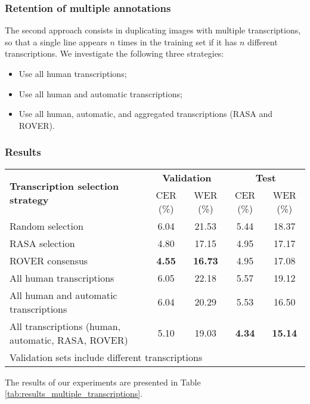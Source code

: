 \documentclass[sigconf]{acmart}
\begin{document}
\subsubsection{Retention of multiple annotations} 
The second approach consists in duplicating images with multiple transcriptions, so that a single line appears $n$ times in the training set if it has $n$ different transcriptions. We investigate the following three strategies:

\begin{itemize}
    \item Use all human transcriptions;
    \item Use all human and automatic transcriptions; 
    \item Use all human, automatic, and aggregated transcriptions (RASA and ROVER).
\end{itemize}

\subsubsection{Results} 

\begin{table*}[thb]
    \centering
    \caption{Evaluation results for experiments on transcription selection. The same PyLaia architecture is trained using different transcriptions}
    \label{tab:results_multiple_transcriptions}
    \begin{tabular}{l|cccc}
    \toprule
        \multirow{2}{*}{\bf Transcription selection strategy} & \multicolumn{2}{c}{\bf Validation\footnotemark[1]} & \multicolumn{2}{c}{\bf Test}\\
        & CER (\%) & WER (\%)  & CER (\%) & WER (\%) \\
    \midrule
        Random selection  & 6.04 & 21.53 & 5.44 & 18.37\\
        RASA selection & 4.80 & 17.15 & 4.95 & 17.17 \\
        ROVER consensus & \textbf{4.55} & \textbf{16.73} & 4.95 & 17.08 \\
        All human transcriptions & 6.05  & 22.18 & 5.57 & 19.12 \\
        All human and automatic transcriptions & 6.04 & 20.29 & 5.53 & 16.50 \\
        All transcriptions (human, automatic, RASA, ROVER) & 5.10 & 19.03 & \textbf{4.34} & \textbf{15.14}  \\
    \bottomrule
    \multicolumn{5}{l}{\footnotemark[1] Validation sets include different transcriptions} \\
    \end{tabular}
\end{table*}
The results of our experiments are presented in Table \ref{tab:results_multiple_transcriptions}.
\end{document}
